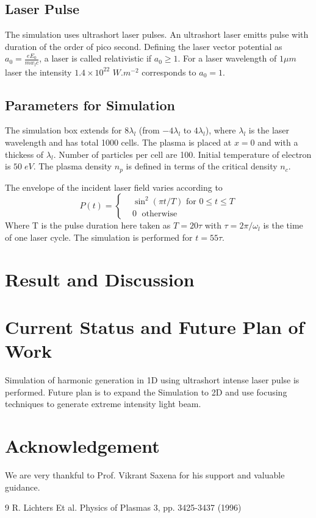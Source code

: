 \documentclass[12pt]{article}
\newenvironment{changemargin}[2]{%
\begin{list}{}{%
\setlength{\topsep}{0pt}%
\setlength{\leftmargin}{#1}%
\setlength{\rightmargin}{#2}%
\setlength{\listparindent}{\parindent}%
\setlength{\itemindent}{\parindent}%
\setlength{\parsep}{\parskip}%
}%
\item[]}{\end{list}}
\begin{document}
\begin{changemargin}{-3cm}{-3cm}
    \subsection{Laser Pulse}
    The simulation uses ultrashort laser pulses. An ultrashort laser emitts pulse with duration of the order of pico second. Defining the laser vector potential as $ a_0 = \frac{eE_0}{m w_l c}$, a laser is called relativistic if $a_0 \ge 1$. For a laser wavelength of $1 \mu m$ laser the intensity $1.4 \times10^{22}$  $W.m^{-2}$ corresponds to $a_0=1$.

    \subsection{Parameters for Simulation}
    The simulation box extends for $8 \lambda _l$ (from $-4 \lambda _l$ to $4 \lambda _l$), where $\lambda_l$ is the laser wavelength and has total 1000 cells. The plasma is placed at $x=0$ and with a thickess of $\lambda_l$. Number of particles per cell are 100. Initial temperature of electron is $50 \; eV$. The plasma density $n_p$ is defined in terms of the critical density $n_c$.

    The envelope of the incident laser field varies according to
    \begin{equation}\label{envelope}
        P(t)=
        \begin{cases}
             & \sin^2(\pi t/T) \text{ for } 0 \leq t \le T \\
             & 0         \;      \text{ otherwise }
        \end{cases}
    \end{equation}
    Where T is the pulse duration here taken as $T=20\tau$ with $\tau = 2\pi/\omega_l$ is the time of one laser cycle. The simulation is performed for $t=55\tau$.
    \section{Result and Discussion}
    \section{Current Status and Future Plan of Work}
    Simulation of harmonic generation in 1D using ultrashort intense laser pulse is performed. Future plan is to expand the Simulation to 2D and use focusing techniques to generate extreme intensity light beam.
    \section{Acknowledgement}
    We are very thankful to Prof. Vikrant Saxena for his support and valuable guidance.
    \begin{thebibliography}{9}
        R. Lichters Et al. Physics of Plasmas 3, pp. 3425-3437 (1996)


\end{thebibliography}
\end{changemargin}
\end{document}
